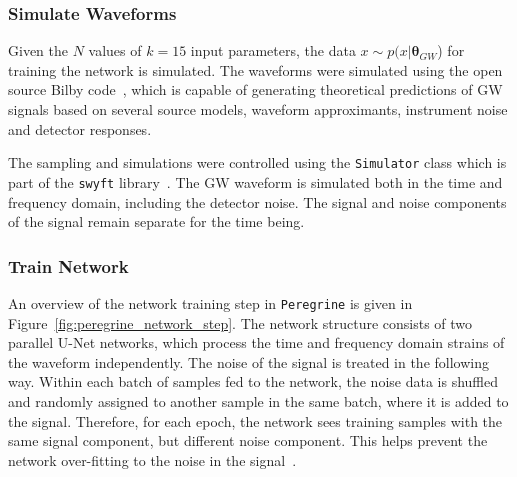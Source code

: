 \subsubsection{Simulate Waveforms}
\label{sec:method_peregine_simulate}
Given the $N$ values of $k=15$ input parameters, the data $x \sim p(x|\boldsymbol{\theta}_{GW}$) for training the network is simulated. The waveforms were simulated using the open source Bilby code~\cite{Ashton_Bilby_2019}, which is capable of generating theoretical predictions of GW signals based on several source models, waveform approximants, instrument noise and detector responses.

The sampling and simulations were controlled using the \texttt{Simulator} class which is part of the \texttt{swyft} library~\cite{Miller2022}. The GW waveform is simulated both in the time and frequency domain, including the detector noise. The signal and noise components of the signal remain separate for the time being.

\subsubsection{Train Network}

An overview of the network training step in \texttt{Peregrine} is given in Figure~\ref{fig:peregrine_network_step}. The network structure consists of two parallel U-Net networks, which process the time and frequency domain strains of the waveform independently. The noise of the signal is treated in the following way. Within each batch of samples fed to the network, the noise data is shuffled and randomly assigned to another sample in the same batch, where it is added to the signal. Therefore, for each epoch, the network sees training samples with the same signal component, but different noise component. This helps prevent the network over-fitting to the noise in the signal~\cite{bhardwaj2023peregrine}.

